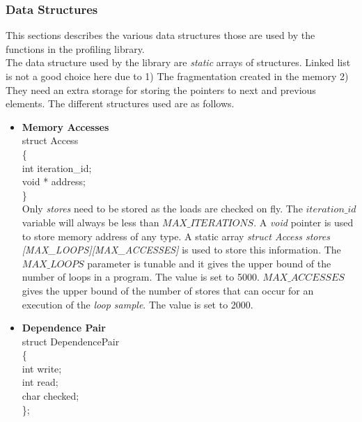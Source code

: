 \documentclass[10pt]{report}          %
\begin{document}
\subsubsection{Data Structures}

This sections describes the various data structures those are used by the functions in the profiling library.\\
The data structure used by the library are \textit{static} arrays of structures.  Linked list is not a good choice here due to 1) The fragmentation created in the memory 2) They need an extra storage for storing the pointers to next and previous elements.  The different structures used are as follows. 


\begin{itemize}
\item \textbf{Memory Accesses} \\

struct Access \\
\{\\
	\hspace*{1 cm} int iteration\_id; \\
	\hspace*{1 cm} void * address;\\
\} \\
Only \textit{stores} need to be stored as the loads are checked on fly.  The $iteration\_id$ variable will always be less than $MAX\_ITERATIONS$.  A \textit{void} pointer is used to store memory address of any type.  A static array \textit{struct Access  stores [MAX\_LOOPS][MAX\_ACCESSES] }is used to store this information.  The $MAX\_LOOPS$ parameter is tunable and it gives the upper bound of the number of loops in a program. The value is set to 5000. $MAX\_ACCESSES$ gives the upper bound of the number of stores that can occur for an execution of the \textit{loop sample}.  The value is set to 2000.

\item \textbf{Dependence Pair} \\

struct DependencePair\\
\{\\
	\hspace*{1 cm} int write;\\
	\hspace*{1 cm} int read;\\
	\hspace*{1 cm} char checked;\\
\};\\


\end{itemize}
\end{document}
